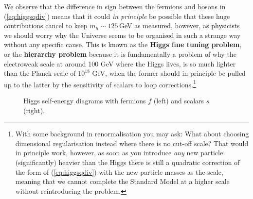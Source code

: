 \documentclass[notes.tex]{subfiles}
\begin{document}
We observe that the difference in sign between the fermions and bosons in (\ref{eq:higgsqdiv}) means that it could {\it in principle} be possible that these huge contributions cancel to keep $m_h \sim 125$\,GeV as measured, however, as physicists we should worry why the Universe seems to be organised in such a strange way without any specific cause. This is known as the {\bf Higgs fine tuning problem}, or the {\bf hierarchy problem} because it is fundamentally a problem of why the electroweak scale at around 100 GeV where the Higgs lives, is so much lighter than the Planck scale of $10^{18}$ GeV, when the former should in principle be pulled up to the latter by the sensitivity of scalars to loop corrections.\footnote{With some background in renormalisation you may ask: What about choosing dimensional regularisation instead where there is no cut-off scale? That would in principle work, however, as soon as you introduce {\it any} new particle (significantly) heavier than the Higgs there is still a quadratic correction of the form of (\ref{eq:higgsqdiv}) with the new particle masses as the scale, meaning that we cannot complete the Standard Model at a higher scale without reintroducing the problem.}

\begin{figure}
\centering
{}
\caption{Higgs self-energy diagrams with fermions $f$ (left) and scalars $s$ (right).}  
\label{fig:hierarchy}
\end{figure}
\end{document}
